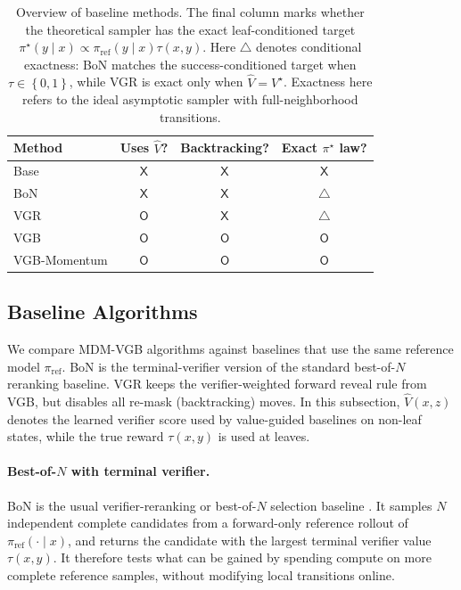 \documentclass{article}
\numberwithin{theorem}{section}
\numberwithin{proposition}{section}
\numberwithin{corollary}{section}
\numberwithin{lemma}{section}
\numberwithin{conjecture}{section}
\numberwithin{remark}{section}
\numberwithin{definition}{section}
\numberwithin{assumption}{section}
\numberwithin{example}{section}
\newcommand{\mbra}[1]{\left\{#1\right\}}
\providecommand{\base}{\pi_{\mathrm{ref}}}
\begin{document}
\begin{table}[h!]
    \centering
    \caption{
    Overview of baseline methods. The final column marks whether the
    theoretical sampler has the exact leaf-conditioned target
    $\pi^\star(y\mid x)\propto \base(y\mid x)\tau(x,y)$. Here
    $\triangle$ denotes conditional exactness: BoN matches the
    success-conditioned target when $\tau\in\mbra{0,1}$, while VGR is exact only
    when $\widehat V=V^\star$. Exactness here refers to the ideal asymptotic sampler with full-neighborhood transitions.
    }
    \label{tab:baseline_taxonomy}
    \vspace{2pt}
    \small
    \setlength{\tabcolsep}{5.0pt}
    \renewcommand{\arraystretch}{1.08}
    \begin{tabular}{l c c c}
    \toprule
    Method
    & Uses $\widehat V$?
    & Backtracking?
    & Exact $\pi^\star$ law? \\
    \midrule
    Base
    & $\mathsf{X}$
    & $\mathsf{X}$
    & $\mathsf{X}$ \\
    BoN
    & $\mathsf{X}$
    & $\mathsf{X}$
    & $\triangle$ \\
    VGR
    & $\mathsf{O}$
    & $\mathsf{X}$
    & $\triangle$ \\
    VGB
    & $\mathsf{O}$
    & $\mathsf{O}$
    & $\mathsf{O}$ \\
    VGB-Momentum
    & $\mathsf{O}$
    & $\mathsf{O}$
    & $\mathsf{O}$ \\
    \bottomrule
    \end{tabular}
\end{table}

\subsection{Baseline Algorithms}
\label{app:subsec:baseline_algorithms}

We compare MDM-VGB algorithms against baselines that use the same reference model $\base$. BoN is the terminal-verifier version of the standard best-of-$N$ reranking baseline. VGR keeps the verifier-weighted forward reveal rule from VGB, but disables all re-mask (backtracking) moves. In this subsection, $\widehat V(x,z)$ denotes the learned verifier score used by value-guided baselines on non-leaf states, while the true reward $\tau(x,y)$ is used at leaves.


\paragraph{Best-of-$N$ with terminal verifier.}
BoN is the usual verifier-reranking or best-of-$N$ selection baseline \citep{cobbe2021training,brown2024large,huang2025bestofn}. It samples $N$ independent complete candidates from a forward-only reference rollout of $\base(\cdot\mid x)$, and returns the candidate with the largest terminal verifier value $\tau(x,y)$. It therefore tests what can be gained by spending compute on more complete reference samples, without modifying local transitions online.
\end{document}
